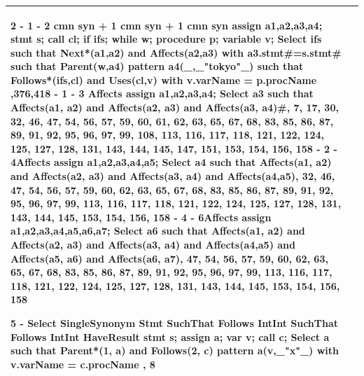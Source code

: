 \documentclass[12pt]{article}
\begin{document}
{{{{{{{{{{{{{\begin{tabular}{|L{5cm} | L{12cm}| }
2 - 1 - 2 cmn syn + 1 cmn syn + 1 cmn syn
 \newline
assign a1,a2,a3,a4; stmt s; call cl; if ifs; while w; procedure p; variable v; \newline
Select ifs such that Next*(a1,a2) and Affects(a2,a3) with a3.stmt\#=s.stmt\# such that Parent(w,a4) pattern a4(\_,\_"tokyo"\_) such that Follows*(ifs,cl) and Uses(cl,v) with v.varName = p.procName
,376,418   - 1 - 3 Affects \newline
assign a1,a2,a3,a4; \newline
Select a3 such that Affects(a1, a2) and Affects(a2, a3) and Affects(a3, a4)\#, 7, 17, 30, 32, 46, 47, 54, 56, 57, 59, 60, 61, 62, 63, 65, 67, 68, 83, 85, 86, 87, 89, 91, 92, 95, 96, 97, 99, 108, 113, 116, 117, 118, 121, 122, 124, 125, 127, 128, 131, 143, 144, 145, 147, 151, 153, 154, 156, 158   -  2 - 4Affects
 \newline
assign a1,a2,a3,a4,a5; \newline
Select a4 such that Affects(a1, a2) and Affects(a2, a3) and Affects(a3, a4) and Affects(a4,a5), 32, 46, 47, 54, 56, 57, 59, 60, 62, 63, 65, 67, 68, 83, 85, 86, 87, 89, 91, 92, 95, 96, 97, 99, 113, 116, 117, 118, 121, 122, 124, 125, 127, 128, 131, 143, 144, 145, 153, 154, 156, 158   - 4 - 6Affects
 \newline
assign a1,a2,a3,a4,a5,a6,a7; \newline
Select a6 such that Affects(a1, a2) and Affects(a2, a3) and Affects(a3, a4) and Affects(a4,a5) and Affects(a5, a6) and Affects(a6, a7), 47, 54, 56, 57, 59, 60, 62, 63, 65, 67, 68, 83, 85, 86, 87, 89, 91, 92, 95, 96, 97, 99, 113, 116, 117, 118, 121, 122, 124, 125, 127, 128, 131, 143, 144, 145, 153, 154, 156, 158  \newline

5 - Select SingleSynonym Stmt SuchThat Follows IntInt SuchThat Follows IntInt HaveResult \newline
stmt s; assign a; var v; call c; \newline
Select a such that Parent*(1, a) and Follows(2, c) pattern a(v,\_"x"\_) with v.varName = c.procName , 8  
 \\\hline
\end{tabular}
}}}}}}}}}}}}}
\end{document}
